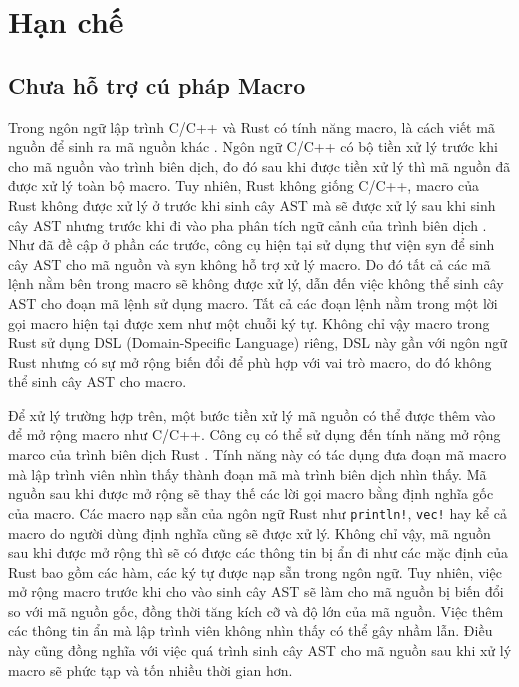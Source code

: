 \section{Hạn chế}
\label{sec:limit}

\subsection{Chưa hỗ trợ cú pháp Macro}

Trong ngôn ngữ lập trình C/C++ và Rust có tính năng macro, là cách viết mã nguồn để sinh ra mã nguồn khác \cite{rustlangMacrosRust}.
Ngôn ngữ C/C++ có bộ tiền xử lý trước khi cho mã nguồn vào trình biên dịch, đo đó sau khi được tiền xử lý thì mã nguồn đã được xử lý toàn bộ macro.
Tuy nhiên, Rust không giống C/C++, macro của Rust không được xử lý ở trước khi sinh cây AST mà sẽ được xử lý sau khi sinh cây AST nhưng trước khi đi vào pha phân tích ngữ cảnh của trình biên dịch \cite{veykrilSourceAnalysis}.
Như đã đề cập ở phần các trước, công cụ hiện tại sử dụng thư viện syn để sinh cây AST cho mã nguồn và syn không hỗ trợ xử lý macro.
Do đó tất cả các mã lệnh nằm bên trong macro sẽ không được xử lý, dẫn đến việc không thể sinh cây AST cho đoạn mã lệnh sử dụng macro.
Tất cả các đoạn lệnh nằm trong một lời gọi macro hiện tại được xem như một chuỗi ký tự.
Không chỉ vậy macro trong Rust sử dụng DSL (Domain-Specific Language) riêng, DSL này gần với ngôn ngữ Rust nhưng có sự mở rộng biến đổi để phù hợp với vai trò macro, do đó không thể sinh cây AST cho macro.

Để xử lý trường hợp trên, một bước tiền xử lý mã nguồn có thể được thêm vào để mở rộng macro như C/C++.
Công cụ có thể sử dụng đến tính năng mở rộng marco của trình biên dịch Rust \cite{rustlangMacroExpansion}.
Tính năng này có tác dụng đưa đoạn mã macro mà lập trình viên nhìn thấy thành đoạn mã mà trình biên dịch nhìn thấy.
Mã nguồn sau khi được mở rộng sẽ thay thế các lời gọi macro bằng định nghĩa gốc của macro.
Các macro nạp sẵn của ngôn ngữ Rust như \texttt{println!}, \texttt{vec!} hay kể cả macro do người dùng định nghĩa cũng sẽ được xử lý.
Không chỉ vậy, mã nguồn sau khi được mở rộng thì sẽ có được các thông tin bị ẩn đi như các mặc định của Rust bao gồm các hàm, các ký tự được nạp sẵn trong ngôn ngữ.
Tuy nhiên, việc mở rộng macro trước khi cho vào sinh cây AST sẽ làm cho mã nguồn bị biến đổi so với mã nguồn gốc, đồng thời tăng kích cỡ và độ lớn của mã nguồn.
Việc thêm các thông tin ẩn mà lập trình viên không nhìn thấy có thể gây nhầm lẫn.
Điều này cũng đồng nghĩa với việc quá trình sinh cây AST cho mã nguồn sau khi xử lý macro sẽ phức tạp và tốn nhiều thời gian hơn.

